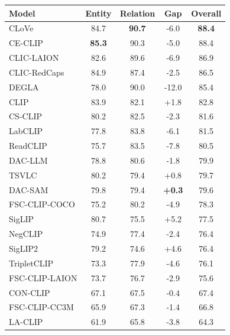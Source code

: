 \begin{tabular}{@{}lcccc@{}}
\toprule
\textbf{Model} & \textbf{Entity} & \textbf{Relation} & \textbf{Gap} & \textbf{Overall} \\
\midrule
CLoVe & 84.7 & \textbf{90.7} & -6.0 & \textbf{88.4} \\
CE-CLIP & \textbf{85.3} & 90.3 & -5.0 & 88.4 \\
CLIC-LAION & 82.6 & 89.6 & -6.9 & 86.9 \\
CLIC-RedCaps & 84.9 & 87.4 & -2.5 & 86.5 \\
DEGLA & 78.0 & 90.0 & -12.0 & 85.4 \\
CLIP & 83.9 & 82.1 & +1.8 & 82.8 \\
CS-CLIP & 80.2 & 82.5 & -2.3 & 81.6 \\
LabCLIP & 77.8 & 83.8 & -6.1 & 81.5 \\
ReadCLIP & 75.7 & 83.5 & -7.8 & 80.5 \\
DAC-LLM & 78.8 & 80.6 & -1.8 & 79.9 \\
TSVLC & 80.2 & 79.4 & +0.8 & 79.7 \\
DAC-SAM & 79.8 & 79.4 & \textbf{+0.3} & 79.6 \\
FSC-CLIP-COCO & 75.2 & 80.2 & -4.9 & 78.3 \\
SigLIP & 80.7 & 75.5 & +5.2 & 77.5 \\
NegCLIP & 74.9 & 77.4 & -2.4 & 76.4 \\
SigLIP2 & 79.2 & 74.6 & +4.6 & 76.4 \\
TripletCLIP & 73.3 & 77.9 & -4.6 & 76.1 \\
FSC-CLIP-LAION & 73.7 & 76.7 & -2.9 & 75.6 \\
CON-CLIP & 67.1 & 67.5 & -0.4 & 67.4 \\
FSC-CLIP-CC3M & 65.9 & 67.3 & -1.4 & 66.8 \\
LA-CLIP & 61.9 & 65.8 & -3.8 & 64.3 \\
\bottomrule
\end{tabular}